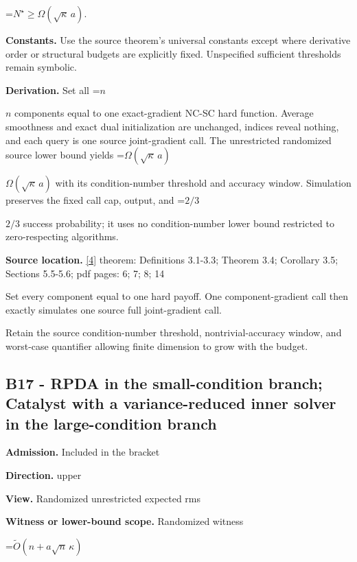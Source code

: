 \documentclass[10pt,a4paper]{article}
\newcommand{\AtlasMath}[1]{\par\begingroup\centering\setbox0=\hbox{$\displaystyle #1$}\ifdim\wd0>1.4\linewidth\typeout{ATLAS WIDE FORMULA: \the\wd0}\fi\ifdim\wd0>\linewidth\resizebox{\linewidth}{!}{\box0}\else\box0\fi\par\endgroup}
\newcommand{\AtlasInlineMath}[1]{\begingroup\setbox0=\hbox{$#1$}\ifdim\wd0>.4\linewidth\endgroup\AtlasMath{#1}\else\endgroup$#1$\fi}
\begin{document}
\AtlasMath{N^\star\ge\Omega(\sqrt\kappa\,a).}


\textbf{Constants.} Use the source theorem’s universal constants except where derivative order or structural budgets are explicitly fixed. Unspecified sufficient thresholds remain symbolic.



\textbf{Derivation.} Set all \AtlasInlineMath{n} components equal to one exact-gradient NC-SC hard function. Average smoothness and exact dual initialization are unchanged, indices reveal nothing, and each query is one source joint-gradient call. The unrestricted randomized source lower bound yields \AtlasInlineMath{\Omega(\sqrt\kappa\,a)} with its condition-number threshold and accuracy window. Simulation preserves the fixed call cap, output, and \AtlasInlineMath{2/3} success probability; it uses no condition-number lower bound restricted to zero-respecting algorithms.



\textbf{Source location.} \href{https://arxiv.org/pdf/2610.00229v2}{[4]} theorem: Definitions 3.1-3.3; Theorem 3.4; Corollary 3.5; Sections 5.5-5.6; pdf pages: 6; 7; 8; 14



Set every component equal to one hard payoff. One component-gradient call then exactly simulates one source full joint-gradient call.



Retain the source condition-number threshold, nontrivial-accuracy window, and worst-case quantifier allowing finite dimension to grow with the budget.



\subsection{B17 - RPDA in the small-condition branch; Catalyst with a variance-reduced inner solver in the large-condition branch}


\textbf{Admission.} Included in the bracket



\textbf{Direction.} upper



\textbf{View.} Randomized unrestricted expected rms



\textbf{Witness or lower-bound scope.} Randomized witness



\AtlasMath{\widetilde O(n+a\sqrt n\,\kappa)}
\end{document}
